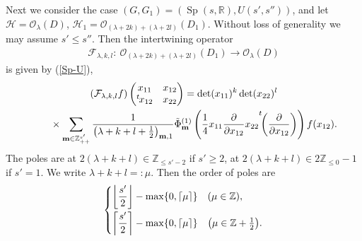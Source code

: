 \documentclass[pdftex]{sigma}
\numberwithin{equation}{section}
\newcommand{\bm}{\mathbf{m}}
\newcommand{\BZ}{\mathbb{Z}}
\newcommand{\BR}{\mathbb{R}}
\newcommand{\cF}{\mathcal{F}}
\newcommand{\cH}{\mathcal{H}}
\newcommand{\cO}{\mathcal{O}}
\begin{document}
Next we consider the case $(G,G_1)=(\operatorname{Sp}(s,\BR),U(s',s''))$, and let $\cH=\cO_\lambda(D)$, $\cH_1=\cO_{(\lambda+2k)+(\lambda+2l)}(D_1)$. Without loss of generality we may assume $s'\le s''$. Then the intertwining operator
\begin{gather*} \cF_{\lambda,k,l}\colon \ \cO_{(\lambda+2k)+(\lambda+2l)}(D_1)\to \cO_\lambda(D) \end{gather*}
is given by (\ref{Sp-U}),
\begin{gather*}
 (\cF_{\lambda,k,l}f)\begin{pmatrix}x_{11}&x_{12}\\{}^t\hspace{-1pt}x_{12}&x_{22}\end{pmatrix}=\det(x_{11})^k\det(x_{22})^l\\
\qquad{} \times\sum_{\bm\in\BZ_{++}^{s'}}\frac{1}{\big(\lambda+k+l+\frac{1}{2}\big)_{\bm,1}}\tilde{\Phi}_\bm^{(1)}
\left(\frac{1}{4}x_{11}\frac{\partial}{\partial x_{12}}x_{22}{\vphantom{\biggl(}}^t\!\!\left(\frac{\partial}{\partial x_{12}}\right)\right)f(x_{12}).
\end{gather*}
The poles are at $2(\lambda+k+l)\in \BZ_{\le s'-2}$ if $s'\ge 2$, at $2(\lambda+k+l)\in 2\BZ_{\le 0}-1$ if $s'=1$. We write $\lambda+k+l=:\mu$. Then the order of poles are
\begin{gather*} \begin{cases} \left\lfloor \dfrac{s'}{2}\right\rfloor-\max\{0,\lceil\mu\rceil\} & (\mu\in \BZ), \vspace{1mm}\\
\left\lceil \dfrac{s'}{2}\right\rceil-\max\{0,\lceil\mu\rceil\} & \big(\mu\in \BZ+\frac{1}{2}\big). \end{cases} \end{gather*}
\end{document}
